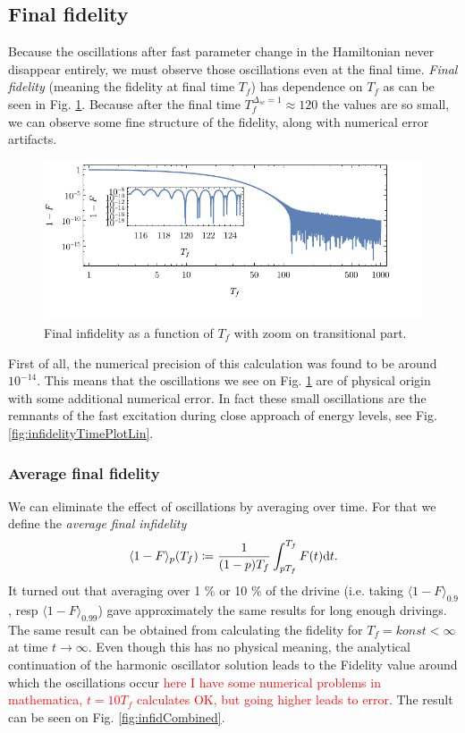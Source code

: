 \subsection{Final fidelity}
Because the oscillations after fast parameter change in the Hamiltonian never disappear entirely, we must observe those oscillations even at the final time. \emph{Final fidelity} (meaning the fidelity at final time $T_f$) has dependence on $T_f$ as can be seen in Fig. \ref{fig:infidelityTfPlotLogLinCombined}. Because after the final time $T_f^{\Delta_{sc}=1}\approx 120$ the values are so small, we can observe some fine structure of the fidelity, along with numerical error artifacts.
\begin{figure}[H]
    \centering
    \includegraphics[scale=1.2]{../img/infidelityTfPlotLogLinCombined1.pdf}
    \caption{Final infidelity as a function of $T_f$ with zoom on transitional part.}
    \label{fig:infidelityTfPlotLogLinCombined}
\end{figure}

First of all, the numerical precision of this calculation was found to be around $10^{-14}$. This means that the oscillations we see on Fig. \ref{fig:infidelityTfPlotLogLinCombined} are of physical origin with some additional numerical error. In fact these small oscillations are the remnants of the fast excitation during close approach of energy levels, see Fig. \ref{fig:infidelityTimePlotLin}. 



\subsubsection{Average final fidelity}
We can eliminate the effect of oscillations by averaging over time. For that we define the \emph{average final infidelity}
\begin{equation}
    \langle 1-F\rangle_p(T_f) \coloneqq \frac{1}{(1-p) T_f}\int_{p T_f}^{T_f} F(t)\mathrm{d} t.
\end{equation}
It turned out that averaging over 1 \% or 10 \% of the drivine (i.e. taking $\langle 1-F\rangle_{0.9}$, resp $\langle 1-F\rangle_{0.99}$) gave approximately the same results for long enough drivings. The same result can be obtained from calculating the fidelity for $T_f=konst<\infty$ at time $t\rightarrow  \infty$. Even though this has no physical meaning, the analytical continuation of the harmonic oscillator solution leads to the Fidelity value around which the oscillations occur \textcolor{red}{here I have some numerical problems in mathematica, $t=10T_f$ calculates OK, but going higher leads to error}. The result can be seen on Fig. \ref{fig:infidCombined}.

